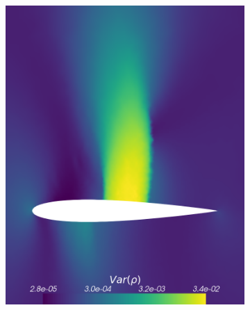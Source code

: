 \begin{figure}[h!]
\begin{subfigure}{0.329\linewidth}
		\includegraphics[width=\linewidth]{figs/Euler2D/sc50UncertainMaSigma0-025PSigma1000-0Dim2_VarRho_log.png}
		\caption{}
		\label{fig:referenceSolutionsub2DVarLog}
	\end{subfigure}\\
	\begin{subfigure}{0.329\linewidth}
		\centering

\end{subfigure}
\end{figure}

